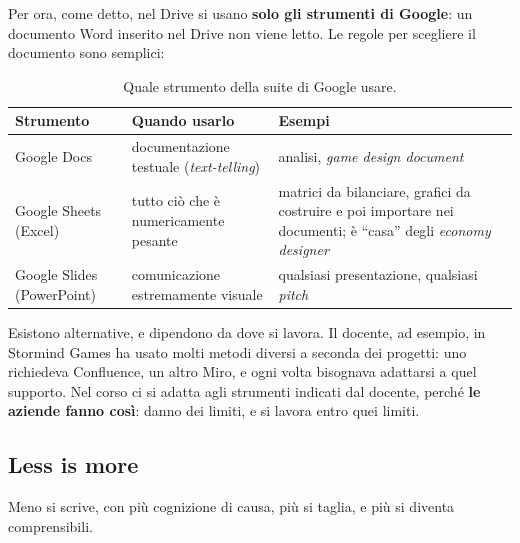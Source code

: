 

Per ora, come detto, nel Drive si usano \textbf{solo gli strumenti di
Google}: un documento Word inserito nel Drive non viene letto. Le regole per
scegliere il documento sono semplici:

\begin{table}[htbp]
  \centering
  \begin{tabular}{@{}p{}p{}p{}@{}}
    \toprule
    \textbf{Strumento} & \textbf{Quando usarlo} & \textbf{Esempi} \\
    \midrule
    Google Docs & documentazione testuale (\emph{text-telling}) & analisi,
      \emph{game design document} \\
    \addlinespace
    Google Sheets (Excel) & tutto ciò che è numericamente pesante & matrici da
      bilanciare, grafici da costruire e poi importare nei documenti; è ``casa''
      degli \emph{economy designer} \\
    \addlinespace
    Google Slides (PowerPoint) & comunicazione estremamente visuale & qualsiasi
      presentazione, qualsiasi \emph{pitch} \\
    \bottomrule
  \end{tabular}
  \caption{Quale strumento della suite di Google usare.}
  \label{tab:strumenti-google}
\end{table}

Esistono alternative, e dipendono da dove si lavora. Il docente, ad esempio,
in Stormind Games ha usato molti metodi diversi a seconda dei progetti:
uno richiedeva Confluence, un altro Miro, e ogni volta bisognava adattarsi a
quel supporto. Nel corso ci si adatta agli strumenti indicati dal docente,
perché \textbf{le aziende fanno così}: danno dei limiti, e si lavora entro
quei limiti.

\subsection{Less is more}



Meno si scrive, con più cognizione di causa, più si taglia, e più si diventa
comprensibili.


